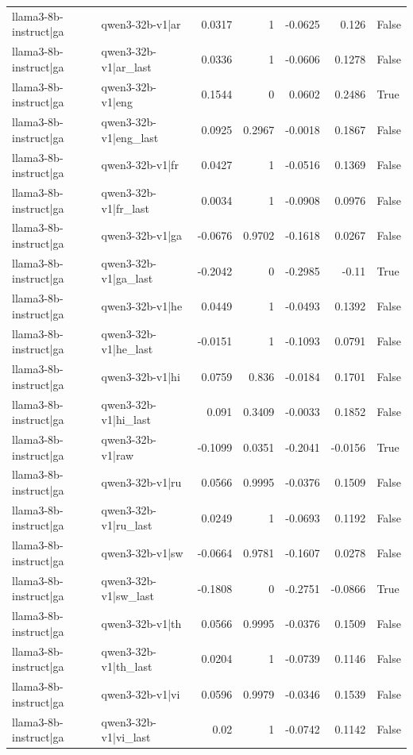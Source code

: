 \begin{table}
\begin{tabular}{l l r r r r l}
llama3-8b-instruct|ga & qwen3-32b-v1|ar & 0.0317 & 1 & -0.0625 & 0.126 & False \\
llama3-8b-instruct|ga & qwen3-32b-v1|ar_last & 0.0336 & 1 & -0.0606 & 0.1278 & False \\
llama3-8b-instruct|ga & qwen3-32b-v1|eng & 0.1544 & 0 & 0.0602 & 0.2486 & True \\
llama3-8b-instruct|ga & qwen3-32b-v1|eng_last & 0.0925 & 0.2967 & -0.0018 & 0.1867 & False \\
llama3-8b-instruct|ga & qwen3-32b-v1|fr & 0.0427 & 1 & -0.0516 & 0.1369 & False \\
llama3-8b-instruct|ga & qwen3-32b-v1|fr_last & 0.0034 & 1 & -0.0908 & 0.0976 & False \\
llama3-8b-instruct|ga & qwen3-32b-v1|ga & -0.0676 & 0.9702 & -0.1618 & 0.0267 & False \\
llama3-8b-instruct|ga & qwen3-32b-v1|ga_last & -0.2042 & 0 & -0.2985 & -0.11 & True \\
llama3-8b-instruct|ga & qwen3-32b-v1|he & 0.0449 & 1 & -0.0493 & 0.1392 & False \\
llama3-8b-instruct|ga & qwen3-32b-v1|he_last & -0.0151 & 1 & -0.1093 & 0.0791 & False \\
llama3-8b-instruct|ga & qwen3-32b-v1|hi & 0.0759 & 0.836 & -0.0184 & 0.1701 & False \\
llama3-8b-instruct|ga & qwen3-32b-v1|hi_last & 0.091 & 0.3409 & -0.0033 & 0.1852 & False \\
llama3-8b-instruct|ga & qwen3-32b-v1|raw & -0.1099 & 0.0351 & -0.2041 & -0.0156 & True \\
llama3-8b-instruct|ga & qwen3-32b-v1|ru & 0.0566 & 0.9995 & -0.0376 & 0.1509 & False \\
llama3-8b-instruct|ga & qwen3-32b-v1|ru_last & 0.0249 & 1 & -0.0693 & 0.1192 & False \\
llama3-8b-instruct|ga & qwen3-32b-v1|sw & -0.0664 & 0.9781 & -0.1607 & 0.0278 & False \\
llama3-8b-instruct|ga & qwen3-32b-v1|sw_last & -0.1808 & 0 & -0.2751 & -0.0866 & True \\
llama3-8b-instruct|ga & qwen3-32b-v1|th & 0.0566 & 0.9995 & -0.0376 & 0.1509 & False \\
llama3-8b-instruct|ga & qwen3-32b-v1|th_last & 0.0204 & 1 & -0.0739 & 0.1146 & False \\
llama3-8b-instruct|ga & qwen3-32b-v1|vi & 0.0596 & 0.9979 & -0.0346 & 0.1539 & False \\
llama3-8b-instruct|ga & qwen3-32b-v1|vi_last & 0.02 & 1 & -0.0742 & 0.1142 & False \\

\end{tabular}
\end{table}
